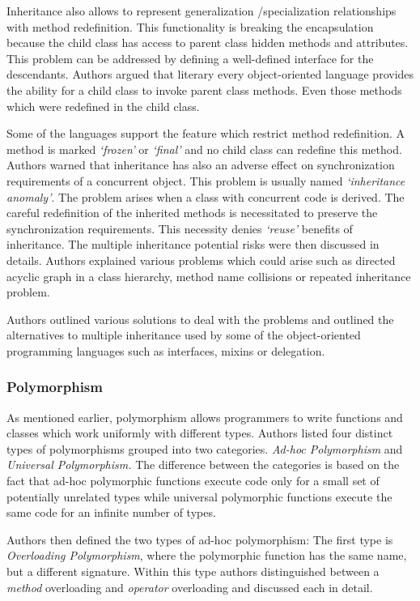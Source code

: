 \documentclass[12pt,twoside,a4paper]{report}
\begin{document}
Inheritance also allows to represent generalization /specialization relationships with method redefinition. This functionality is breaking the encapsulation because the child class has access to parent class hidden methods and attributes. This problem can be addressed by defining a well-defined interface for the descendants. Authors argued that literary every object-oriented language provides the ability for a child class to invoke parent class methods. Even those methods which were redefined in the child class. 

Some of the languages support the feature which restrict method redefinition. A method is marked \textit{‘frozen’} or \textit{‘final’} and no child class can redefine this method. Authors warned that inheritance has also an adverse effect on synchronization requirements of a concurrent object. This problem is usually named \textit{‘inheritance anomaly’}. The problem
arises when a class with concurrent code is derived. The careful redefinition of the inherited methods is necessitated to preserve the synchronization requirements. This necessity denies \textit{‘reuse’} benefits of inheritance. The multiple inheritance potential risks were then discussed in details. Authors explained various problems which could arise such as directed acyclic graph in a class hierarchy, method name collisions or repeated inheritance problem. 

Authors outlined various solutions to deal with the problems and outlined the alternatives to multiple inheritance used by some of the object-oriented programming languages such as interfaces, mixins or delegation.

\subsubsection{Polymorphism}
As mentioned earlier, polymorphism allows programmers to write functions and classes which work uniformly with different types. Authors listed four distinct types of polymorphisms grouped into two categories. \textit{Ad-hoc Polymorphism} and \textit{Universal Polymorphism.} The difference between the categories is based on the fact that ad-hoc polymorphic functions execute code only for a small set of potentially unrelated types while universal polymorphic functions execute the same code for an infinite number of types. 

Authors then defined the two types of ad-hoc polymorphism: The first type is \textit{Overloading Polymorphism}, where the polymorphic function has the same name, but a different signature. Within this type authors distinguished between a \textit{method} overloading and \textit{operator} overloading and discussed each in detail. 
\end{document}
